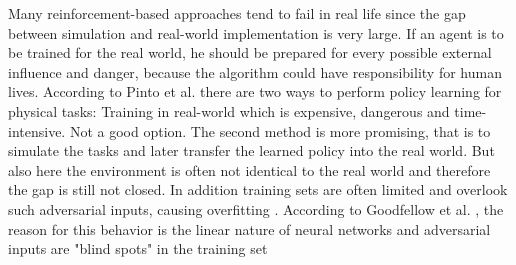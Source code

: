 \begin{comment}
- MOTIVATION
- limitations of random testing --> adversarial approach
- gap between simulation & real world
- model uncert
- adversarial learning is a system which involves focussing on the systems weaknesness
\end{comment}
\begin{comment}

- computer performance, reinforcement learning gets better
- traditional RL fails in real world --> gap between simulation & real world big & not enough training data (set)
- when prepared for real world -> agent should be trained with every potential danger/disturbance to the system
- training sets are limited
- new approach: adversarial reinforcement learning 

//Definition:
-Adversarial training: training the model to malicious input on purpose -> make it more robust to attack, unknown input and reduce test error \cite{MachineLearningAtScale}
- adversarial inputs are "blind spots" in training set \cite{harnessing_goodfellow}
- Linear nature of machine learning is the cause of this \cite{harnessing_goodfellow}
- Agent learns to operate in the presence of a destabilizing adversary -> the adversary agent learns an optimal destabilizing policy --> becomes the "perfect" enemy and generates training data better & broader than a human generated one

-

\end{comment}

Many reinforcement-based approaches tend to fail in real life since the gap between simulation and real-world implementation is very large. If an agent is to be trained for the real world, he should be prepared for every possible external influence and danger, because the algorithm could have responsibility for human lives. According to Pinto et al. \cite{robustPinto2017Mar} there are two ways to perform policy learning for physical tasks: Training in real-world which is expensive, dangerous and time-intensive. Not a good option. The second method is more promising, that is to simulate the tasks and later transfer the learned policy into the real world. But also here the environment is often not identical to the real world and therefore the gap is still not closed. In addition training sets are often limited and overlook such adversarial inputs, causing overfitting \cite{robustPinto2017Mar}. According to Goodfellow et al. \cite{harnessing_goodfellow}, the reason for this behavior is the linear nature of neural networks and adversarial inputs are "blind spots" in the training set 

